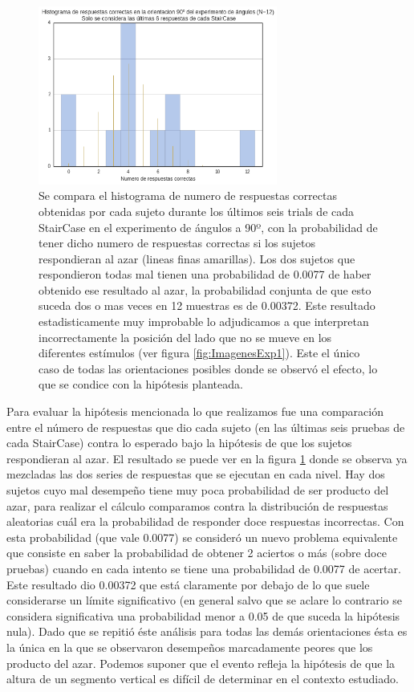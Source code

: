 \documentclass{article}
\numberwithin{figure}{section}
\begin{document}
    \begin{figure}
        \center
        \includegraphics[width=0.7\textwidth]{Imagenes/Exp1_Saturacion.png}
        \caption{Se compara el histograma de numero de respuestas correctas obtenidas por cada sujeto durante los últimos seis trials de cada StairCase en el experimento de ángulos a 90º, con la probabilidad de tener dicho numero de respuestas correctas si los sujetos respondieran al azar (lineas finas amarillas). Los dos sujetos que respondieron todas mal tienen una probabilidad de 0.0077 de haber obtenido ese resultado al azar, la probabilidad conjunta de que esto suceda dos o mas veces en 12 muestras es de 0.00372. Este resultado estadisticamente muy improbable lo adjudicamos a que interpretan incorrectamente la posición del lado que no se mueve en los diferentes estímulos (ver figura \ref{fig:ImagenesExp1}). Este el único caso de todas las orientaciones posibles donde se observó el efecto, lo que se condice con la hipótesis planteada.}
        \label{fig:Exp1Saturacion}
    \end{figure}  
    
    Para evaluar la hipótesis mencionada lo que realizamos fue una comparación entre el número de respuestas que dio cada sujeto (en las últimas seis pruebas de cada StairCase) contra lo esperado bajo la hipótesis de que los sujetos respondieran al azar. El resultado se puede ver en la figura \ref{fig:Exp1Saturacion} donde se observa ya mezcladas las dos series de respuestas que se ejecutan en cada nivel. Hay dos sujetos cuyo mal desempeño tiene muy poca probabilidad de ser producto del azar, para realizar el cálculo comparamos contra la distribución de respuestas aleatorias cuál era la probabilidad de responder doce respuestas incorrectas. Con esta probabilidad (que vale 0.0077) se consideró un nuevo problema equivalente que consiste en saber la probabilidad de obtener 2 aciertos o más (sobre doce pruebas) cuando en cada intento se tiene una probabilidad de 0.0077 de acertar. Este resultado dio 0.00372 que está claramente por debajo de lo que suele considerarse un límite significativo (en general salvo que se aclare lo contrario se considera significativa una probabilidad menor a 0.05 de que suceda la hipótesis nula). Dado que se repitió éste análisis para todas las demás orientaciones ésta es la única en la que se observaron desempeños marcadamente peores que los producto del azar. Podemos suponer que el evento refleja la hipótesis de que la altura de un segmento vertical es difícil de determinar en el contexto estudiado.
    
\end{document}

